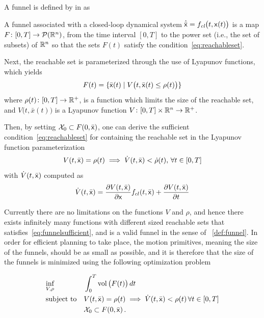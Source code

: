 A funnel is defined by \citeauthor{majumdarFunnelLibrariesRealtime2017} in
\cite{majumdarFunnelLibrariesRealtime2017} as
\begin{definition}
  \label{def:funnel}
  A funnel associated with a closed-loop dynamical system \(\dot{\bar{{\mathbf{\mathsf{x}}}}}
  = f_{\textit{cl}}\big( t,{\mathbf{\mathsf{x}}}(t) \big) \) is a map \(F \colon [0,T] \rightarrow
  \mathcal{P}(\mathbb{R}^n)\), from the time interval \([0,T]\) to the power set (i.e.,
  the set of subsets) of \(\mathbb{R}^n\) so that the sets \(F(t)\) satisfy the
  condition~\cref{eq:reachableset}.
\end{definition}

Next, the reachable set is parameterized through the use of Lyapunov functions,
which yields
\begin{equation}
  F(t) = \lbrace\bar{{\mathbf{\mathsf{x}}}}(t) \mid V \big(t, \bar{{\mathbf{\mathsf{x}}}}(t) \leq \rho (t) \big)\rbrace
\end{equation}
where \(\rho (t) \colon [0,T] \rightarrow \mathbb{R}^+\), is a function which limits the
size of the reachable set, and \(V \big(t,\bar{x}(t) \big)\) is a Lyapunov function \(V
\colon [0,T] \times \mathbb{R}^n \rightarrow \mathbb{R}^+\).

Then, by setting \(\mathcal{X}_0 \subset F(0,\bar{{\mathbf{\mathsf{x}}}})\), one can derive
the sufficient condition~\cref{eq:reachableset} for containing the reachable set
in the Lyapunov function parameterization
\begin{equation}
  \label{eq:funnelsufficient}
  V(t,\bar{{\mathbf{\mathsf{x}}}}) = \rho(t) \implies \dot{V}(t,\bar{{\mathbf{\mathsf{x}}}}) < \dot{\rho}(t), \, \forall t \in [0,T]
\end{equation}
with \(\dot{V}(t,\bar{{\mathbf{\mathsf{x}}}})\) computed as
\begin{equation}
  \dot{V}(t,\bar{{\mathbf{\mathsf{x}}}}) = \frac{\partial V(t,\bar{{\mathbf{\mathsf{x}}}})}{\partial {\mathbf{\mathsf{x}}}} f_{cl}(t,\bar{{\mathbf{\mathsf{x}}}}) + \frac{\partial V(t,\bar{{\mathbf{\mathsf{x}}}})}{\partial t}
\end{equation}

Currently there are no limitations on the functions \(V\) and \(\rho\), and
hence there exists infinitely many functions with different sized reachable sets
that satisfies~\cref{eq:funnelsufficient}, and is a valid funnel in the sense of
~\cref{def:funnel}. In order for efficient planning to take place, the motion
primitives, meaning the size of the funnels, should be as small as possible, and
it is therefore that the size of the funnels is minimized using the following
optimization problem

\begin{align}
  \label{eq:funneloptimizationproblem}
  &\underset{V,\rho}{\text{inf}} \; &&\int_{0}^{T} \operatorname{vol}\big( F(t) \big) \, dt \\
  &\text{subject to} && V(t,\bar{{\mathbf{\mathsf{x}}}}) = \rho (t) \implies \dot{V}(t,\bar{{\mathbf{\mathsf{x}}}}) < \rho (t) \, \forall t \in [0,T] \nonumber \\
  && &\mathcal{X}_0 \subset F(0,\bar{{\mathbf{\mathsf{x}}}}) \, . \nonumber
\end{align} 

